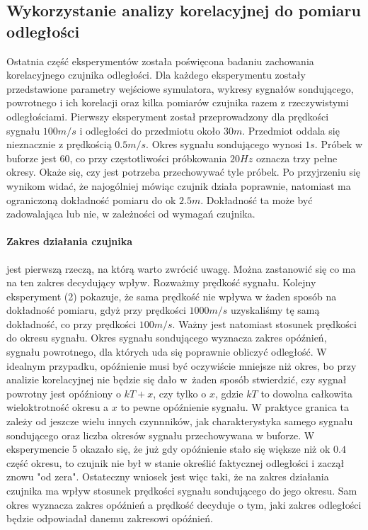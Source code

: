 \documentclass[12pt]{article}
\begin{document}
{        \subsection{Wykorzystanie analizy korelacyjnej do pomiaru odległości} {
            Ostatnia część eksperymentów została poświęcona badaniu zachowania
            korelacyjnego czujnika odległości. Dla każdego eksperymentu zostały
            przedstawione parametry wejściowe symulatora, wykresy sygnałów sondującego,
            powrotnego i ich korelacji oraz kilka pomiarów czujnika razem z rzeczywistymi
            odległościami. Pierwszy eksperyment został przeprowadzony dla prędkości
            sygnału $100m/s$ i odległości do przedmiotu około $30m$. Przedmiot oddala się
            nieznacznie z prędkością $0.5m/s$. Okres sygnału sondującego wynosi $1s$.
            Próbek w buforze jest $60$, co przy częstotliwości próbkowania $20Hz$ oznacza
            trzy pełne okresy. Okaże się, czy jest potrzeba przechowywać tyle próbek. Po
            przyjrzeniu się wynikom widać, że najogólniej mówiąc czujnik działa poprawnie,
            natomiast ma ograniczoną dokładność pomiaru do ok $2.5m$. Dokładność ta może
            być zadowalająca lub nie, w zależności od wymagań czujnika.

            \paragraph{Zakres działania czujnika} jest pierwszą rzeczą, na którą warto
            zwrócić uwagę. Można zastanowić się co ma na ten zakres decydujący wpływ.
            Rozważmy prędkość sygnału. Kolejny eksperyment (2) pokazuje, że sama prędkość
            nie wpływa w żaden sposób na dokładność pomiaru, gdyż przy prędkości $1000m/s$
            uzyskaliśmy tę samą dokładność, co przy prędkości $100m/s$. Ważny jest
            natomiast stosunek prędkości do okresu sygnału. Okres sygnału sondującego
            wyznacza zakres opóźnień, sygnału powrotnego, dla których uda się poprawnie
            obliczyć odległość. W idealnym przypadku, opóźnienie musi być oczywiście
            mniejsze niż okres, bo przy analizie korelacyjnej nie będzie się dało w żaden
            sposób stwierdzić, czy sygnał powrotny jest opóźniony o $kT + x$, czy tylko o
            $x$, gdzie $kT$ to dowolna całkowita wieloktrotność okresu a $x$ to pewne
            opóźnienie sygnału. W praktyce granica ta zależy od jeszcze wielu innych
            czynnników, jak charakterystyka samego sygnału sondującego oraz liczba okresów
            sygnału przechowywana w buforze. W eksperymencie 5 okazało się, że już gdy
            opóźnienie stało się większe niż ok $0.4$ część okresu, to czujnik nie był w
            stanie określić faktycznej odległości i zaczął znowu "od zera". Ostateczny
            wniosek jest więc taki, że na zakres działania czujnika ma wpływ stosunek
            prędkości sygnału sondującego do jego okresu. Sam okres wyznacza zakres
            opóźnień a prędkość decyduje o tym, jaki zakres odległości będzie odpowiadał
            danemu zakresowi opóźnień.

}}
\end{document}
